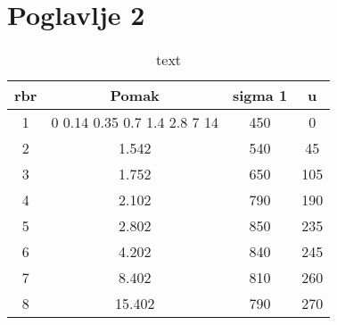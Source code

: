 \chapter{Poglavlje 2}


\lipsum[1-3]


\begin{table}
	\centering
	\caption{text}
	\label{tab:red}
	\begin{tabular}{c c c c}
		\hline
		rbr & Pomak & sigma 1 & u \\ \hline
		1 & 0 0.14 0.35 0.7 1.4 2.8 7 14 & 450 & 0 \\ \hline
		2 & 1.542 & 540 & 45 \\ \hline
		3 & 1.752 & 650 & 105 \\ \hline
		4 & 2.102 & 790 & 190 \\ \hline
		5 & 2.802 & 850 & 235 \\ \hline
		6 & 4.202 & 840 & 245 \\ \hline
		7 & 8.402 & 810 & 260 \\ \hline
		8 & 15.402 & 790 & 270 \\ \hline
	\end{tabular}
\end{table}


\lipsum[1-3]